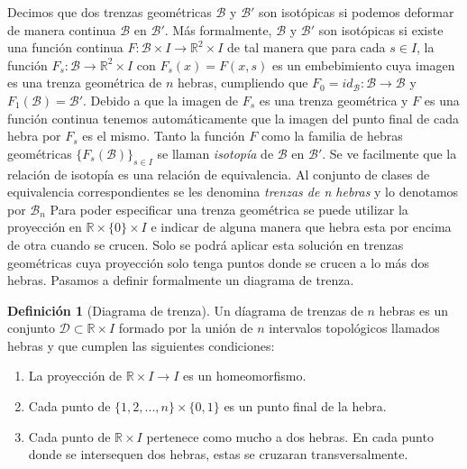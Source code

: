 \documentclass[12pt]{article}
\theoremstyle{definition}
\newtheorem{defi}{Definición}[section]
\begin{document}
Decimos que dos trenzas geométricas $\mathcal{B}$ y $\mathcal{B}'$ son isotópicas si podemos deformar de manera continua $\mathcal{B}$ en $\mathcal{B}'$. Más formalmente, $\mathcal{B}$ y $\mathcal{B}'$ son isotópicas si existe una función continua $F : \mathcal{B} \times I \rightarrow \mathbb{R}^2\times I$ de tal manera que para cada $s\in I$, la función $F_s : \mathcal{B}\rightarrow \mathbb{R}^2\times I$ con $F_s(x)= F(x,s)$ es un embebimiento cuya imagen es una trenza geométrica de $n$ hebras, cumpliendo que $F_0 = id_{\mathcal{B}}: \mathcal{B}\rightarrow \mathcal{B}$ y $F_1(\mathcal{B}) = \mathcal{B}'$. Debido a que la imagen de $F_s$ es una trenza geométrica y $F$ es una función continua tenemos automáticamente que la imagen del punto final de cada hebra por $F_s$ es el mismo.
\newline
\newline
Tanto la función $F$ como la familia de hebras geométricas $\{F_s(\mathcal{B})\}_{s\in I}$ se llaman \textit{isotopía} de $\mathcal{B}$ en $\mathcal{B}'$. Se ve facilmente que la relación de isotopía es una relación de equivalencia. Al conjunto de clases de equivalencia correspondientes se les denomina \textit{trenzas de n hebras} y lo denotamos por $\mathcal{B}_n$
\newline
\newline
Para poder especificar una trenza geométrica se puede utilizar la proyección en $\mathbb{R}\times\{0\}\times I$ e indicar de alguna manera que hebra esta por encima de otra cuando se crucen. Solo se podrá aplicar esta solución en trenzas geométricas cuya proyección solo tenga puntos donde se crucen a lo más dos hebras. Pasamos a definir formalmente un diagrama de trenza.


\begin{defi}[Diagrama de trenza]\label{diagrama_trenza}
Un díagrama de trenzas de $n$ hebras es un conjunto $\mathcal{D}\subset\mathbb{R}\times I$ formado por la unión de $n$ intervalos topológicos llamados hebras y que cumplen las siguientes condiciones: 
\begin{enumerate}
\item La proyección de $\mathbb{R}\times I\rightarrow I$ es un homeomorfismo.
\item Cada punto de $\{1,2,...,n\}\times\{0,1\}$ es un punto final de la hebra.
\item Cada punto de $\mathbb{R}\times I$ pertenece como mucho a dos hebras. En cada punto donde se intersequen dos hebras, estas se cruzaran transversalmente.


\end{enumerate}
\end{defi}
\end{document}
